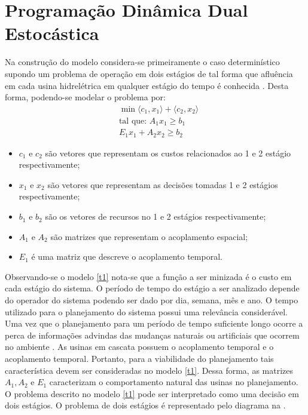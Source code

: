 \chapter{Programa\c c\~ao Din\^amica Dual Estoc\'astica}
Na constru\c c\~ao do modelo considera-se primeiramente o caso determin\'istico supondo um problema de opera\c
c\~ao em dois est\'agios de tal forma que 
aflu\^encia em cada usina hidrel\'etrica em qualquer est\'agio do tempo \'e conhecida \cite{cp}. Desta forma,
podendo-se modelar o problema por:
\begin{align}
\label{t1}
&\min \langle c_1,x_1\rangle + \langle c_2,x_2\rangle \nonumber \\
&\mbox{tal que: }	A_1 x_1 \geq b_1 \\
&E_1 x_1 + A_2 x_2 \geq b_2 \nonumber
\end{align}
\begin{itemize}
  \item $c_1$ e $c_2$ s\~ao vetores que representam os custos relacionados ao 1 e 2 est\'agio respectivamente;
  \item $x_1$ e $x_2$ s\~ao vetores que representam as decis\~oes tomadas 1 e 2 est\'agios respectivamente;
  \item $b_1$ e $b_2$  s\~ao os vetores de recursos no 1 e 2 est\'agios respectivamente;
  \item $A_1$ e $A_2$ s\~ao matrizes que representam o acoplamento espacial;
  \item $E_1$ \'e uma matriz que descreve o acoplamento temporal.
\end{itemize}
Observando-se o modelo \ref{t1} nota-se que a fun\c c\~ao a ser minizada \'e o custo em cada est\'agio do sistema. O
per\'iodo de tempo do est\'agio a ser analizado
depende do operador do sistema podendo ser dado por dia, semana, m\^es e ano. O tempo
utilizado para o planejamento do sistema possui uma relev\^ancia consider\'avel. Uma vez que o planejamento para um
per\'iodo de tempo suficiente longo ocorre a perca de informa\c c\~oes advindas das mudan\c cas naturais ou artificiais
que ocorrem no ambiente \cite{tom}. As usinas em cascata possuem o acoplamento  temporal e o
acoplamento temporal. Portanto, para a viabilidade do planejamento tais caracter\'istica devem ser consideradas no
modelo \ref{t1}. Dessa forma, as matrizes $A_1, A_2$  e $E_1$ caracterizam o comportamento natural das usinas no planejamento.
O problema descrito no modelo \ref{t1} pode ser interpretado como uma decis\~ao em dois est\'agios. O problema de dois
est\'agios \'e representado pelo
diagrama na .
